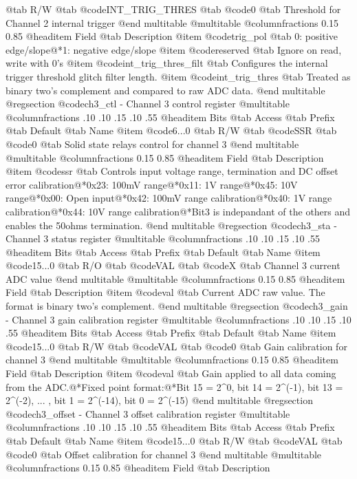 @tab R/W @tab
@code{INT_TRIG_THRES}
@tab @code{0} @tab 
Threshold for Channel 2 internal trigger
@end multitable
@multitable @columnfractions 0.15 0.85
@headitem Field @tab Description
@item @code{trig_pol} @tab 0: positive edge/slope@*1: negative edge/slope
@item @code{reserved} @tab Ignore on read, write with 0's
@item @code{int_trig_thres_filt} @tab Configures the internal trigger threshold glitch filter length.
@item @code{int_trig_thres} @tab Treated as binary two's complement and compared to raw ADC data.
@end multitable
@regsection @code{ch3_ctl} - Channel 3 control register
@multitable @columnfractions .10 .10 .15 .10 .55
@headitem Bits @tab Access @tab Prefix @tab Default @tab Name
@item @code{6...0}
@tab R/W @tab
@code{SSR}
@tab @code{0} @tab 
Solid state relays control for channel 3
@end multitable
@multitable @columnfractions 0.15 0.85
@headitem Field @tab Description
@item @code{ssr} @tab Controls input voltage range, termination and DC offset error calibration@*0x23: 100mV range@*0x11: 1V range@*0x45: 10V range@*0x00: Open input@*0x42: 100mV range calibration@*0x40: 1V range calibration@*0x44: 10V range calibration@*Bit3 is indepandant of the others and enables the 50ohms termination.
@end multitable
@regsection @code{ch3_sta} - Channel 3 status register
@multitable @columnfractions .10 .10 .15 .10 .55
@headitem Bits @tab Access @tab Prefix @tab Default @tab Name
@item @code{15...0}
@tab R/O @tab
@code{VAL}
@tab @code{X} @tab 
Channel 3 current ADC value
@end multitable
@multitable @columnfractions 0.15 0.85
@headitem Field @tab Description
@item @code{val} @tab Current ADC raw value. The format is binary two's complement.
@end multitable
@regsection @code{ch3_gain} - Channel 3 gain calibration register
@multitable @columnfractions .10 .10 .15 .10 .55
@headitem Bits @tab Access @tab Prefix @tab Default @tab Name
@item @code{15...0}
@tab R/W @tab
@code{VAL}
@tab @code{0} @tab 
Gain calibration for channel 3
@end multitable
@multitable @columnfractions 0.15 0.85
@headitem Field @tab Description
@item @code{val} @tab Gain applied to all data coming from the ADC.@*Fixed point format:@*Bit 15 = 2^0, bit 14 = 2^(-1), bit 13 = 2^(-2), ... , bit 1 = 2^(-14), bit 0 = 2^(-15)
@end multitable
@regsection @code{ch3_offset} - Channel 3 offset calibration register
@multitable @columnfractions .10 .10 .15 .10 .55
@headitem Bits @tab Access @tab Prefix @tab Default @tab Name
@item @code{15...0}
@tab R/W @tab
@code{VAL}
@tab @code{0} @tab 
Offset calibration for channel 3
@end multitable
@multitable @columnfractions 0.15 0.85
@headitem Field @tab Description
